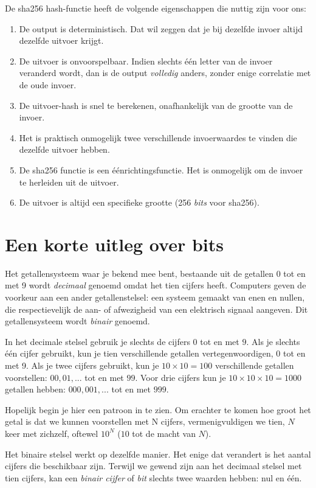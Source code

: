 \documentclass[smalldemyvopaper,11pt,twoside,onecolumn,openright,extrafontsizes]{memoir}
\begin{document}
De sha256 hash-functie heeft de volgende eigenschappen die nuttig zijn voor ons:

\begin{enumerate}
    \item De output is deterministisch. Dat wil zeggen dat je bij dezelfde invoer altijd dezelfde uitvoer krijgt.
    \item De uitvoer is onvoorspelbaar. Indien slechts één letter van de invoer veranderd wordt, dan is de output \textit{volledig} anders, zonder enige correlatie met de oude invoer.
    \item De uitvoer-hash is snel te berekenen, onafhankelijk van de grootte van de invoer.
    \item Het is praktisch onmogelijk twee verschillende invoerwaardes te vinden die dezelfde uitvoer hebben.
    \item De sha256 functie is een éénrichtingsfunctie. Het is onmogelijk om de invoer te herleiden uit de uitvoer.
    \item De uitvoer is altijd een specifieke grootte (256 \textit{bits} voor sha256).
\end{enumerate}

\section{Een korte uitleg over bits}

Het getallensysteem waar je bekend mee bent, bestaande uit de getallen 0 tot en met 9 wordt \textit{decimaal} genoemd omdat het tien cijfers heeft. Computers geven de voorkeur aan een ander getallenstelsel: een systeem gemaakt van enen en nullen, die respectievelijk de aan- of afwezigheid van een elektrisch signaal aangeven. Dit getallensysteem wordt \textit{binair} genoemd.

In het decimale stelsel gebruik je slechts de cijfers $0$ tot en met $9$. Als je slechts één cijfer gebruikt, kun je tien verschillende getallen vertegenwoordigen, 0 tot en met 9. Als je twee cijfers gebruikt, kun je $10 \times 10 = 100$ verschillende getallen voorstellen: $00, 01,...$ tot en met $99$. Voor drie cijfers kun je $10 \times 10 \times 10 = 1000$ getallen hebben: $000, 001,...$ tot en met $999$.

Hopelijk begin je hier een patroon in te zien. Om erachter te komen hoe groot het getal is dat we kunnen voorstellen met N cijfers, vermenigvuldigen we tien, $N$ keer met zichzelf, oftewel $10^N$ ($10$ tot de macht van $N$).

Het binaire stelsel werkt op dezelfde manier. Het enige dat verandert is het aantal cijfers die beschikbaar zijn. Terwijl we gewend zijn aan het decimaal stelsel met tien cijfers, kan een \textit{binair cijfer} of \textit{bit} slechts twee waarden hebben: nul en één.
\end{document}
